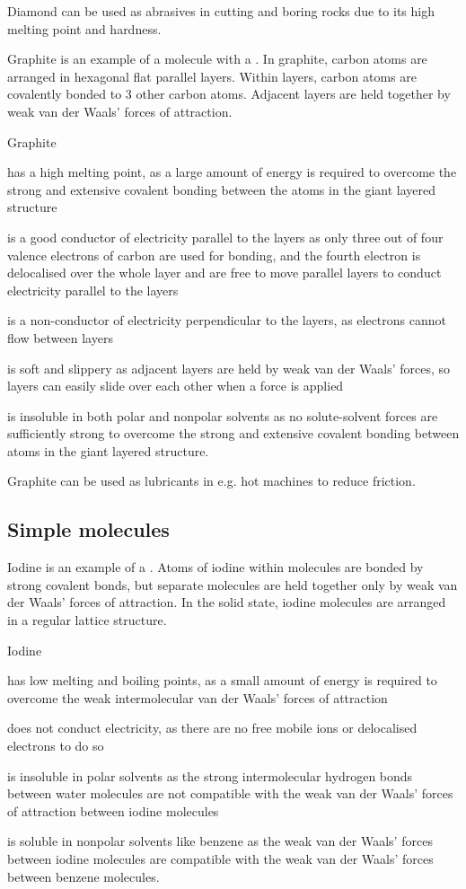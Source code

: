 \documentclass[Chemistry.tex]{subfiles}
\begin{document}
Diamond can be used as abrasives in cutting and boring rocks due to its high melting point and hardness.

Graphite is an example of a molecule with a . In graphite, carbon atoms are arranged in hexagonal flat parallel layers. Within layers, carbon atoms are covalently bonded to 3 other carbon atoms. Adjacent layers are held together by weak van der Waals' forces of attraction.

Graphite \begin{slinenum}
\item has a high melting point, as a large amount of energy is required to overcome the strong and extensive covalent bonding between the atoms in the giant layered structure
\item is a good conductor of electricity parallel to the layers as only three out of four valence electrons of carbon are used for bonding, and the fourth electron is delocalised over the whole layer and are free to move parallel layers to conduct electricity parallel to the layers
\item is a non-conductor of electricity perpendicular to the layers, as electrons cannot flow between layers
\item is soft and slippery as adjacent layers are held by weak van der Waals' forces, so layers can easily slide over each other when a force is applied
\item is insoluble in both polar and nonpolar solvents as no solute-solvent forces are sufficiently strong to overcome the strong and extensive covalent bonding between atoms in the giant layered structure.\end{slinenum}

Graphite can be used as lubricants in e.g. hot machines to reduce friction.
\subsection{Simple molecules}
Iodine is an example of a . Atoms of iodine within molecules are bonded by strong covalent bonds, but separate molecules are held together only by weak van der Waals' forces of attraction. In the solid state, iodine molecules are arranged in a regular lattice structure.

Iodine \begin{slinenum}
\item has low melting and boiling points, as a small amount of energy is required to overcome the weak intermolecular van der Waals' forces of attraction
\item does not conduct electricity, as there are no free mobile ions or delocalised electrons to do so
\item is insoluble in polar solvents as the strong intermolecular hydrogen bonds between water molecules are not compatible with the weak van der Waals' forces of attraction between iodine molecules
\item is soluble in nonpolar solvents like benzene as the weak van der Waals' forces between iodine molecules are compatible with the weak van der Waals' forces between benzene molecules.
\end{slinenum}
\end{document}

